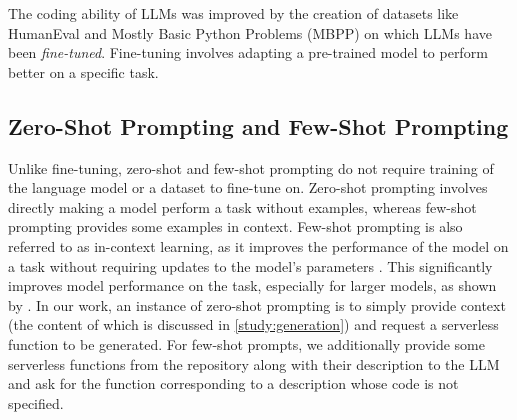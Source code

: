The coding ability of LLMs was improved by the creation of datasets like HumanEval \cite{chen2021evaluating} and Mostly Basic Python Problems (MBPP) \cite{austin2021mbpp} on which LLMs have been \textit{fine-tuned}. Fine-tuning involves adapting a pre-trained model to perform better on a specific task.

\subsection{Zero-Shot Prompting and Few-Shot Prompting}\label{backg:llm_prompting}
Unlike fine-tuning, zero-shot and few-shot prompting do not require 
training of the language model or
a dataset to fine-tune on. Zero-shot prompting involves directly making a model perform a task without examples, whereas few-shot prompting provides some examples in context. Few-shot prompting is also referred to as in-context learning, as it improves the performance of the model on a task without requiring updates to the model's parameters \cite{jurafsky_martin}. This significantly improves model performance on the task, especially for larger models, as shown by \cite{brown2020language}. In our work, an instance of zero-shot prompting is to simply provide context (the content of which is discussed in \ref{study:generation}) and request a serverless function to be generated. For few-shot prompts, we additionally provide some serverless functions from the repository along with their description to the LLM and ask for the function corresponding to a description whose code is not specified.
\vspace*{-1mm}